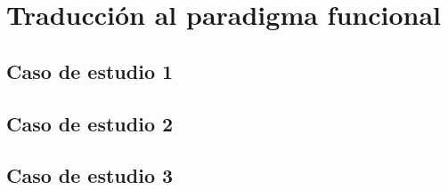 \chapter{Traducción al paradigma funcional}

\section{Caso de estudio 1}


\section{Caso de estudio 2}

\section{Caso de estudio 3}